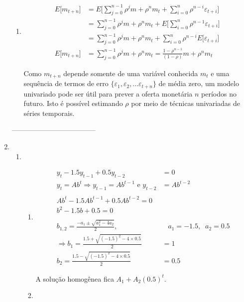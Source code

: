 \begin{enumerate}
\begin{enumerate}
	\item 
	\begin{align*}
		E\bigg[m_{t+n}\bigg]&=E\bigg[\sum\limits_{j=0}^{n-1}\rho^jm+\rho^nm_t+\sum\limits_{i=0}^{n}\rho^{n-i}\varepsilon_{t+i}\bigg]\\
		&=\sum\limits_{j=0}^{n-1}\rho^jm+\rho^nm_t+E\bigg[\sum\limits_{i=0}^{n}\rho^{n-1}\varepsilon_{t+i}\bigg]\\
		&=\sum\limits_{j=0}^{n-1}\rho^jm+\rho^nm_t+\sum\limits_{i=0}^{n}\rho^{n-i}E\bigg[\varepsilon_{t+i}\bigg]\\
		E\bigg[m_{t+n}\bigg]&=\sum\limits_{j=0}^{n-1}\rho^jm+\rho^nm_t=\frac{1-\rho^{n-1}}{(1-\rho)}m+\rho^nm_t
	\end{align*}
	
	Como $m_{t+n}$ depende somente de uma variável conhecida $m_t$ e uma sequência de termos de erro $\{\varepsilon_1,\varepsilon_2,...\varepsilon_{t+n}\}$ de média zero, um modelo univariado pode ser útil para prever a oferta monetária $n$ períodos no futuro. Isto é possível estimando $\rho$ por meio de técnicas univariadas de séries temporais.
\end{enumerate}
	------------------------------------
	
	\item 
	\begin{enumerate}
		\item 
	
	 
\begin{enumerate}
	\item 
	
	
	\begin{align*}
		y_t-1.5y_{t-1}+0.5y_{t-2}&=0\\
		y_t=Ab^t\Rightarrow y_{t-1}=Ab^{t-1}\text{ e }y_{t-2}&=Ab^{t-2}\\
		\\
		Ab^t-1.5Ab^{t-1}+0.5Ab^{t-2}=0\\
		b^2-1.5b+0.5=0\\
		\\
		b_{1,2}=\frac{-a_1\pm \sqrt{a_1^2-4a_2}}{2},& \;\;\;a_1=-1.5,\;\;a_2=0.5\\
		\Rightarrow b_1=\frac{1.5+\sqrt{(-1.5)^2-4 \times 0.5}}{2}&=1\\
		b_2=\frac{1.5-\sqrt{(-1.5)^2-4 \times 0.5}}{2}&=0.5
	\end{align*}
	
	A solução homogênea fica $A_1+A_2(0.5)^t$.
	
	\item 
	

\end{enumerate}
\end{enumerate}
\end{enumerate}
